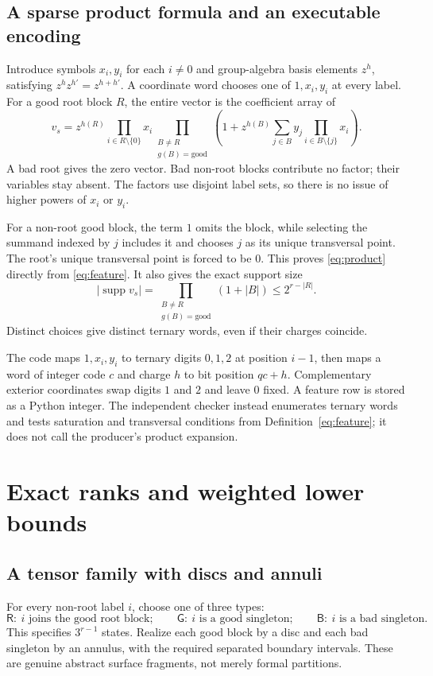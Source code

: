 \documentclass[11pt,letterpaper]{article}
\theoremstyle{definition}
\newcommand{\supp}{\operatorname{supp}}
\begin{document}
\subsection{A sparse product formula and an executable encoding}\label{sec:product}
Introduce symbols $x_i,y_i$ for each $i\ne0$ and group-algebra basis elements $z^h$, satisfying $z^h z^{h'}=z^{h+h'}$. A coordinate word chooses one of $1,x_i,y_i$ at every label. For a good root block $R$, the entire vector is the coefficient array of
\begin{equation}
 v_s=z^{h(R)}\prod_{i\in R\setminus\{0\}}x_i
       \prod_{\substack{B\ne R\\g(B)=\mathrm{good}}}
       \left(1+z^{h(B)}\sum_{j\in B}y_j\prod_{i\in B\setminus\{j\}}x_i\right).
 \label{eq:product}
\end{equation}
A bad root gives the zero vector. Bad non-root blocks contribute no factor; their variables stay absent. The factors use disjoint label sets, so there is no issue of higher powers of $x_i$ or $y_i$.

For a non-root good block, the term $1$ omits the block, while selecting the summand indexed by $j$ includes it and chooses $j$ as its unique transversal point. The root's unique transversal point is forced to be $0$. This proves \eqref{eq:product} directly from \eqref{eq:feature}. It also gives the exact support size
\begin{equation}
 |\supp v_s|=\prod_{\substack{B\ne R\\g(B)=\mathrm{good}}}(1+|B|)
               \leq 2^{r-|R|}.\label{eq:support}
\end{equation}
Distinct choices give distinct ternary words, even if their charges coincide.

The code maps $1,x_i,y_i$ to ternary digits $0,1,2$ at position $i-1$, then maps a word of integer code $c$ and charge $h$ to bit position $qc+h$. Complementary exterior coordinates swap digits $1$ and $2$ and leave $0$ fixed. A feature row is stored as a Python integer. The independent checker instead enumerates ternary words and tests saturation and transversal conditions from Definition~\eqref{eq:feature}; it does not call the producer's product expansion.

\section{Exact ranks and weighted lower bounds}
\subsection{A tensor family with discs and annuli}
For every non-root label $i$, choose one of three types:
\[
 \mathsf R:\ i\text{ joins the good root block};\qquad
 \mathsf G:\ i\text{ is a good singleton};\qquad
 \mathsf B:\ i\text{ is a bad singleton}.
\]
This specifies $3^{r-1}$ states. Realize each good block by a disc and each bad singleton by an annulus, with the required separated boundary intervals. These are genuine abstract surface fragments, not merely formal partitions.
\end{document}
